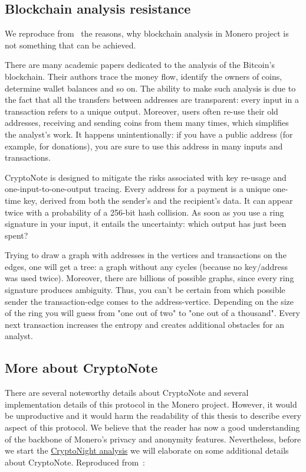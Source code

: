 \subsection{Blockchain analysis resistance}
We reproduce from~\cite{cryptonote} the reasons, why blockchain analysis in Monero project is not something that can be achieved.

There are many academic papers dedicated to the analysis of the Bitcoin's blockchain. Their authors trace the money flow, identify the owners of coins, determine wallet balances and so on. The ability to make such analysis is due to the fact that all the transfers between addresses are transparent: every input in a transaction refers to a unique output. Moreover, users often re-use their old addresses, receiving and sending coins from them many times, which simplifies the analyst's work. It happens unintentionally: if you have a public address (for example, for donations), you are sure to use this address in many inputs and transactions.

CryptoNote is designed to mitigate the risks associated with key re-usage and one-input-to-one-output tracing. Every address for a payment is a unique one-time key, derived from both the sender's and the recipient's data. It can appear twice with a probability of a 256-bit hash collision. As soon as you use a ring signature in your input, it entails the uncertainty: which output has just been spent?

Trying to draw a graph with addresses in the vertices and transactions on the edges, one will get a tree: a graph without any cycles (because no key/address was used twice). Moreover, there are billions of possible graphs, since every ring signature produces ambiguity. Thus, you can't be certain from which possible sender the transaction-edge comes to the address-vertice. Depending on the size of the ring you will guess from "one out of two" to "one out of a thousand". Every next transaction increases the entropy and creates additional obstacles for an analyst.

\subsection{More about CryptoNote}
There are several noteworthy details about CryptoNote and several implementation details of this protocol in the Monero project. However, it would be unproductive and it would harm the readability of this thesis to describe every aspect of this protocol. We believe that the reader has now a good understanding of the backbone of Monero's privacy and anonymity features. Nevertheless, before we start the \hyperref[ch:cryptonight]{CryptoNight analysis} we will elaborate on some additional details about CryptoNote. Reproduced from~\cite{cryptonote}:

